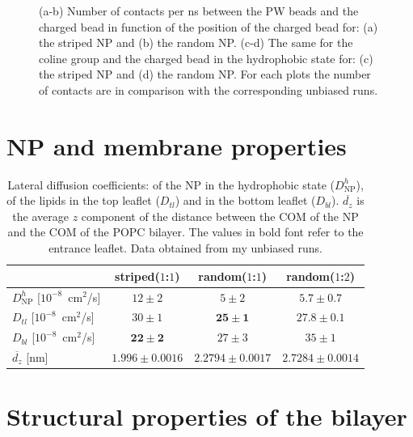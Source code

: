 \begin{figure}[p]
{	}
	\caption{(a-b) Number of contacts per ns between the \acs{PW} beads and the charged bead in function of the position of the charged bead for: (a) the striped \acs{NP} and (b) the random \acs{NP}. (c-d) The same for the coline group and the charged bead  in the hydrophobic state for: (c) the striped \ac{NP} and (d) the random \acs{NP}. For each plots the number of contacts are in comparison with the corresponding unbiased runs.}
	\label{fig:contactsUn}
\end{figure}
\restoregeometry


\section{NP and membrane properties}

\begin{table}[h!t]
	\centering
	\begin{tabular}{lccc}
		\toprule
		\,		 & striped($1$:$1$)		& random($1$:$1$)		& random($1$:$2$)					\\ \toprule
		$D^h_{\text{NP}}$ [$10^{-8}$~cm$^2$/s] & $12 \pm 2$ & $5 \pm 2$ & $5.7 \pm 0.7$ 				\\ \midrule
		$D_{tl}$ [$10^{-8}$~cm$^2$/s] & $30 \pm 1$ & $\mathbf{25 \pm 1}$ & $\mathbf{27.8 \pm 0.1}$	\\ \midrule
		$D_{bl}$ [$10^{-8}$~cm$^2$/s] & $\mathbf{22 \pm 2}$ & $27 \pm 3$	& $35 \pm 1$			\\ \midrule
		$\overline{d_z}$ [nm] & $1.996 \pm 0.0016$	& $2.2794 \pm 0.0017$	& $2.7284 \pm 0.0014$	\\ \bottomrule
	\end{tabular}
	\caption{Lateral diffusion coefficients: of the \acs{NP} in the hydrophobic state ($D^h_\text{NP}$), of the lipids in the top leaflet ($D_{tl}$) and in the bottom leaflet ($D_{bl}$). $\overline{d_z}$ is the average $z$ component of the distance between the \acs{COM} of the \acs{NP} and the \acs{COM} of the \acs{POPC} bilayer. The values in bold font refer to the entrance leaflet. Data obtained from my unbiased runs.}
	\label{tab:NPMembProperties}
\end{table}


\section{Structural properties of the bilayer}
